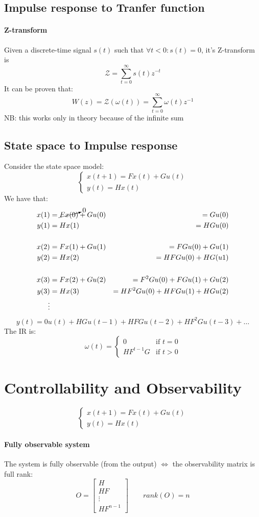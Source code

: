 \documentclass{article}
\begin{document}
\subsection{Impulse response to Tranfer function}
\paragraph{Z-transform} Given a discrete-time signal $s(t)$ such that $\forall t<0:s(t)=0$, it's Z-transform is
\[
\mathcal{Z}=\sum_{t=0}^\infty s(t)z^{-t}
\]
It can be proven that:
\[
W(z)=\mathcal{Z}(\omega(t))=\sum_{t=0}^\infty \omega(t)z^{-1}
\]
NB: this works only in theory because of the infinite sum

\subsection{State space to Impulse response}
Consider the state space model:
\[
\begin{cases}
x(t+1)=Fx(t)+Gu(t)\\
y(t)=Hx(t)
\end{cases}
\]
We have that:
\begin{align*}
x(1)&=\cancelto{0}{Fx(0)}+Gu(0)&=Gu(0)\\
y(1)&=Hx(1)&=HGu(0)\\
\\
x(2)&=Fx(1)+Gu(1)&=FGu(0)+Gu(1)\\
y(2)&=Hx(2)&=HFGu(0)+HG(u1)\\
\\
x(3)&=Fx(2)+Gu(2)&=F^2Gu(0)+FGu(1)+Gu(2)\\
y(3)&=Hx(3)&=HF^2Gu(0)+HFGu(1)+HGu(2)\\
\vdots
\end{align*}
\[
y(t)=0u(t)+HGu(t-1)+HFGu(t-2)+HF^2Gu(t-3)+\dots
\]
The IR is:
\[
\omega(t)=
\begin{cases}
0 & \text{if } t=0\\
HF^{t-1}G & \text{if } t>0
\end{cases}
\]


\section{Controllability and Observability}
\[
\begin{cases}
x(t+1)=Fx(t)+Gu(t)\\
y(t)=Hx(t)
\end{cases}
\]
\paragraph{Fully observable system} The system is fully observable (from the output) $\iff$ the observability matrix is full rank:
\[
O=\begin{bmatrix}
H\\HF\\\vdots\\HF^{n-1}
\end{bmatrix}
\qquad
rank(O)=n
\]
\end{document}
